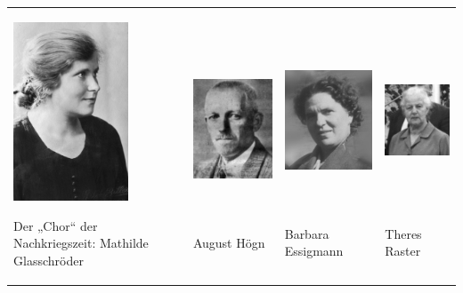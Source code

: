 \begin{flushleft}
\tablefirsthead{}
\tablehead{}
\tabletail{}
\tablelasttail{}
\begin{supertabular}{m{3.5939999cm}m{4.361cm}m{4.123cm}m{3.3769999cm}}

\includegraphics[width=3.413cm,height=5.323cm]{pictures/zulassungsarbeit-img047.jpg}

Der „Chor“ der Nachkriegszeit: Mathilde
Glasschröder &

\includegraphics[width=4.18cm,height=5.308cm]{pictures/zulassungsarbeit-img048.jpg}

August Högn &

\includegraphics[width=3.942cm,height=5.3cm]{pictures/zulassungsarbeit-img049.jpg}

Barbara Essigmann  &

\includegraphics[width=3.194cm,height=5.281cm]{pictures/zulassungsarbeit-img050.jpg}

Theres Raster\\
\end{supertabular}
\end{flushleft}

